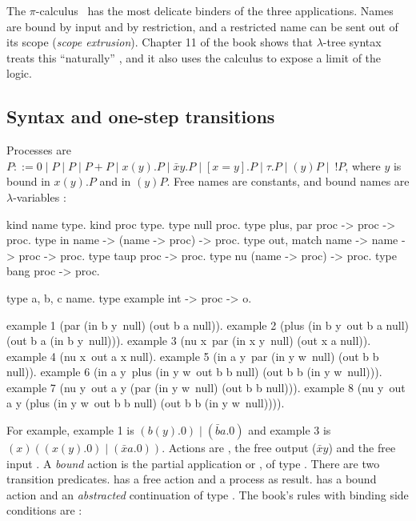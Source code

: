 {{The $\pi$-calculus~\cite{MilnerParrowWalker1992} has the most delicate binders of the three
applications. Names are bound by input and by restriction, and a restricted name can be sent out of its
scope (\emph{scope extrusion}). Chapter 11 of the book shows that $\lambda$-tree syntax treats this
``naturally'' , and it also uses the calculus to expose a limit of the logic.

\subsection{Syntax and one-step transitions}\label{sec:apps-pi-one}

Processes are $P ::= 0\mid P\mid P\mid P+P\mid x(y).P\mid \bar x y.P\mid [x=y].P\mid \tau.P\mid (y)P\mid\ !P$,
where $y$ is bound in $x(y).P$ and in $(y)P$. Free names are constants, and bound names are
$\lambda$-variables :

\begin{lprolog}
kind name  type.
kind proc  type.
type null        proc.
type plus, par   proc -> proc -> proc.
type in          name -> (name -> proc) -> proc.
type out, match  name -> name -> proc -> proc.
type taup        proc -> proc.
type nu          (name -> proc) -> proc.
type bang        proc -> proc.

type a, b, c     name.
type example     int -> proc -> o.

example 1 (par (in b y\ null) (out b a null)).
example 2 (plus (in b y\ out b a null) (out b a (in b y\ null))).
example 3 (nu x\ par (in x y\ null) (out x a null)).
example 4 (nu x\ out a x null).
example 5 (in a y\ par (in y w\ null) (out b b null)).
example 6 (in a y\ plus (in y w\ out b b null)
                         (out b b (in y w\ null))).
example 7 (nu y\ out a y (par (in y w\ null) (out b b null))).
example 8 (nu y\ out a y (plus (in y w\ out b b null)
                               (out b b (in y w\ null)))).
\end{lprolog}

\noindent For example, example 1 is $(b(y).0)\mid(\bar b a.0)$ and example 3 is
$(x)((x(y).0)\mid(\bar x a.0))$. Actions are , the free output  ($\bar x y$) and the free
input . A \emph{bound} action is the partial application  or , of type
. There are two transition predicates.  has a free action and a process
as result.  has a bound action and an \emph{abstracted} continuation of type
. The book's rules with binding side conditions are :

}}
